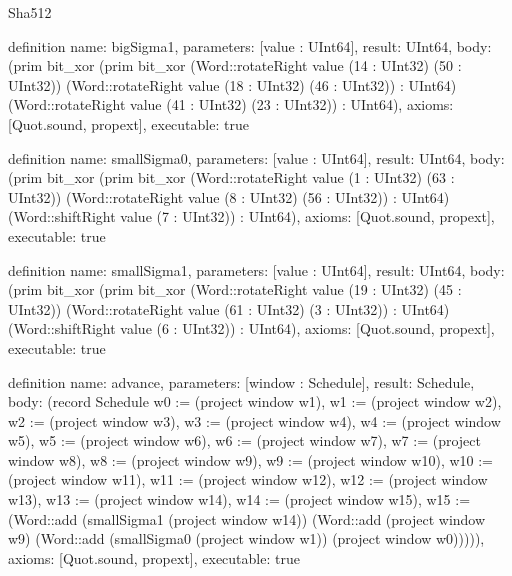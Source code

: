 \begin{lexlean}{Sha512}
\begin{semanticmodule}
definition{
  name: bigSigma1,
  parameters: [value : UInt64],
  result: UInt64,
  body: (prim bit_xor (prim bit_xor (Word::rotateRight value (14 : UInt32) (50 : UInt32)) (Word::rotateRight value (18 : UInt32) (46 : UInt32)) : UInt64) (Word::rotateRight value (41 : UInt32) (23 : UInt32)) : UInt64),
  axioms: [Quot.sound, propext],
  executable: true
}

definition{
  name: smallSigma0,
  parameters: [value : UInt64],
  result: UInt64,
  body: (prim bit_xor (prim bit_xor (Word::rotateRight value (1 : UInt32) (63 : UInt32)) (Word::rotateRight value (8 : UInt32) (56 : UInt32)) : UInt64) (Word::shiftRight value (7 : UInt32)) : UInt64),
  axioms: [Quot.sound, propext],
  executable: true
}

definition{
  name: smallSigma1,
  parameters: [value : UInt64],
  result: UInt64,
  body: (prim bit_xor (prim bit_xor (Word::rotateRight value (19 : UInt32) (45 : UInt32)) (Word::rotateRight value (61 : UInt32) (3 : UInt32)) : UInt64) (Word::shiftRight value (6 : UInt32)) : UInt64),
  axioms: [Quot.sound, propext],
  executable: true
}

definition{
  name: advance,
  parameters: [window : Schedule],
  result: Schedule,
  body: (record Schedule {w0 := (project window w1), w1 := (project window w2), w2 := (project window w3), w3 := (project window w4), w4 := (project window w5), w5 := (project window w6), w6 := (project window w7), w7 := (project window w8), w8 := (project window w9), w9 := (project window w10), w10 := (project window w11), w11 := (project window w12), w12 := (project window w13), w13 := (project window w14), w14 := (project window w15), w15 := (Word::add (smallSigma1 (project window w14)) (Word::add (project window w9) (Word::add (smallSigma0 (project window w1)) (project window w0))))}),
  axioms: [Quot.sound, propext],
  executable: true
}


\end{semanticmodule}
\end{lexlean}
